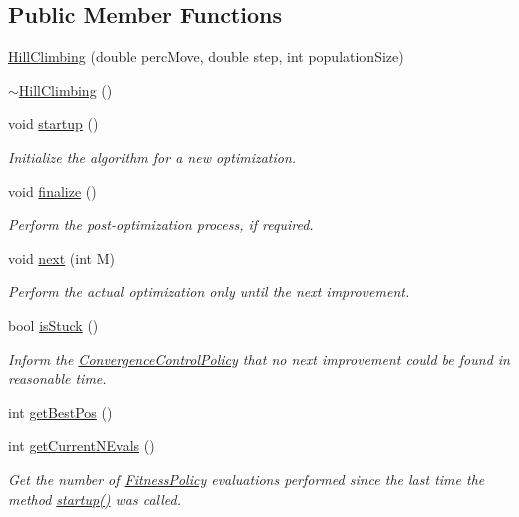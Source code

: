 \subsection*{Public Member Functions}
\begin{DoxyCompactItemize}
\item 
\hyperlink{classHillClimbing_ac41e8c4d1d1319c82732f0d93bb361fd}{Hill\+Climbing} (double perc\+Move, double step, int population\+Size)
\item 
\hyperlink{classHillClimbing_a4355842a97a5613a57c7b31a0a1c4793}{$\sim$\+Hill\+Climbing} ()
\item 
void \hyperlink{classHillClimbing_a845d2e4cac39582bf1218a90431c2f3c}{startup} ()
\begin{DoxyCompactList}\small\item\em Initialize the algorithm for a new optimization. \end{DoxyCompactList}\item 
void \hyperlink{classHillClimbing_a5339276bd6e3c941b1a16c30a7794f1c}{finalize} ()
\begin{DoxyCompactList}\small\item\em Perform the post-\/optimization process, if required. \end{DoxyCompactList}\item 
void \hyperlink{classHillClimbing_a7c67b745880b93be26eb4fa113f0e37f}{next} (int M)
\begin{DoxyCompactList}\small\item\em Perform the actual optimization only until the next improvement. \end{DoxyCompactList}\item 
bool \hyperlink{classHillClimbing_a6361582c1aeab1be7fce4b553530691f}{is\+Stuck} ()
\begin{DoxyCompactList}\small\item\em Inform the \hyperlink{classConvergenceControlPolicy}{Convergence\+Control\+Policy} that no next improvement could be found in reasonable time. \end{DoxyCompactList}\item 
int \hyperlink{classHillClimbing_ae2e46d5992ba0b32ede2d00f891ae52d}{get\+Best\+Pos} ()
\item 
int \hyperlink{classHillClimbing_afb9bb2d5757df676cc1fe6079d82cad2}{get\+Current\+N\+Evals} ()
\begin{DoxyCompactList}\small\item\em Get the number of \hyperlink{classFitnessPolicy}{Fitness\+Policy} evaluations performed since the last time the method \hyperlink{classHillClimbing_a845d2e4cac39582bf1218a90431c2f3c}{startup()} was called. \end{DoxyCompactList}\item 

\end{DoxyCompactItemize}
